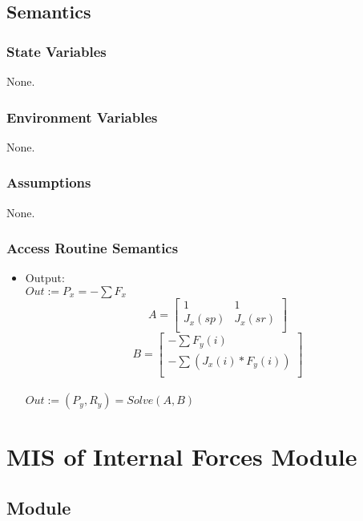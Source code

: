 \documentclass[12pt, titlepage]{article}
\begin{document}
\subsection{Semantics}
\subsubsection{State Variables}
None.

\subsubsection{Environment Variables}
None.

\subsubsection{Assumptions}
None.
\subsubsection{Access Routine Semantics}
\begin{itemize}
    \item Output: \\
    $Out:=P_x=-\sum F_x$\\
\[A=
   \left[ {\begin{array}{cc}
    1 & 1 \\
    J_x(sp) & J_x(sr) \\
  \end{array} } \right]\]
\[B=
   \left[ {\begin{array}{cc}
    -\sum F_y(i) \\
    -\sum (J_x(i)* F_y(i))  \\
  \end{array} } \right]
\]\\ 
$Out:=(P_y,R_y) = Solve(A,B)$\\

\end{itemize}

\section{MIS of Internal Forces Module\label{mSpec} }

\subsection{Module}
\end{document}
